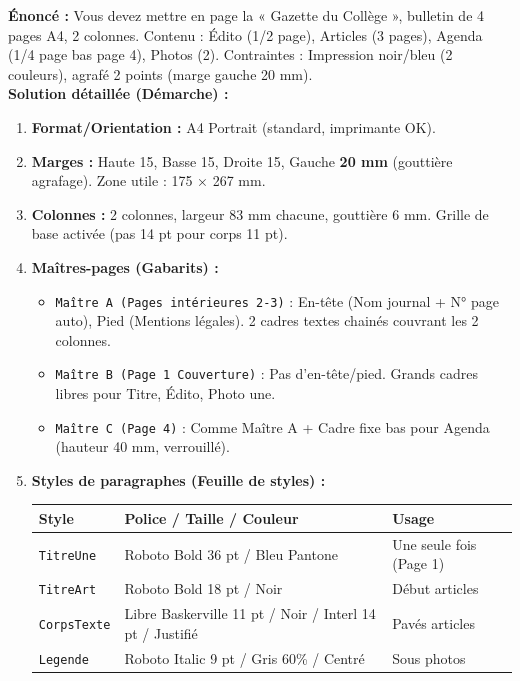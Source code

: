 \documentclass[11pt]{article}
\begin{document}
\begin{exoresolu}
\textbf{Énoncé :} Vous devez mettre en page la « Gazette du Collège », bulletin de 4 pages A4, 2 colonnes. Contenu : Édito (1/2 page), Articles (3 pages), Agenda (1/4 page bas page 4), Photos (2). Contraintes : Impression noir/bleu (2 couleurs), agrafé 2 points (marge gauche 20 mm).
\\ \tcblower
\textbf{Solution détaillée (Démarche) :}
\begin{enumerate}
    \item \textbf{Format/Orientation :} A4 Portrait (standard, imprimante OK).
    \item \textbf{Marges :} Haute 15, Basse 15, Droite 15, Gauche \textbf{20 mm} (gouttière agrafage). Zone utile : 175 × 267 mm.
    \item \textbf{Colonnes :} 2 colonnes, largeur 83 mm chacune, gouttière 6 mm. Grille de base activée (pas 14 pt pour corps 11 pt).
    \item \textbf{Maîtres-pages (Gabarits) :}
        \begin{itemize}
            \item \texttt{Maître A (Pages intérieures 2-3)} : En-tête (Nom journal + N° page auto), Pied (Mentions légales). 2 cadres textes chainés couvrant les 2 colonnes.
            \item \texttt{Maître B (Page 1 Couverture)} : Pas d'en-tête/pied. Grands cadres libres pour Titre, Édito, Photo une.
            \item \texttt{Maître C (Page 4)} : Comme Maître A + Cadre fixe bas pour Agenda (hauteur 40 mm, verrouillé).
        \end{itemize}
    \item \textbf{Styles de paragraphes (Feuille de styles) :}
    \begin{center}
    \begin{tabularx}{\linewidth}{|l|X|X|}\hline
    \rowcolor{popblueL}
    \textbf{Style} & \textbf{Police / Taille / Couleur} & \textbf{Usage} \\\hline
    \texttt{TitreUne} & Roboto Bold 36 pt / Bleu Pantone & Une seule fois (Page 1) \\\hline
    \texttt{TitreArt} & Roboto Bold 18 pt / Noir & Début articles \\\hline
    \texttt{CorpsTexte} & Libre Baskerville 11 pt / Noir / Interl 14 pt / Justifié & Pavés articles \\\hline
    \texttt{Legende} & Roboto Italic 9 pt / Gris 60\% / Centré & Sous photos \\\hline

\end{tabularx}
\end{center}
\end{enumerate}
\end{exoresolu}
\end{document}

